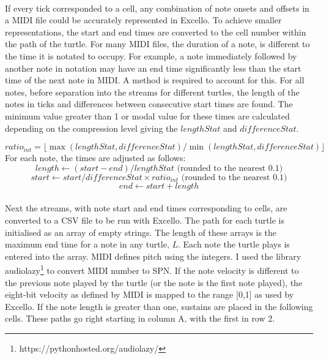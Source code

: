 \paragraph{} If every tick corresponded to a cell, any combination of note onsets and offsets in a MIDI file could be accurately represented in Excello. To achieve smaller representations, the start and end times are converted to the cell number within the path of the turtle. For many MIDI files, the duration of a note, is different to the time it is notated to occupy. For example, a note immediately followed by another note in notation may have an end time significantly less than the start time of the next note in MIDI. A method is required to account for this. For all notes, before separation into the streams for different turtles, the length of the notes in ticks and differences between consecutive start times are found. The minimum value greater than 1 or modal value for these times are calculated depending on the compression level giving the $lengthStat$ and $differenceStat$.

  $$ratio_{int} = \lfloor\max(lengthStat, differenceStat)/\min(lengthStat, differenceStat)\rfloor$$
For each note, the times are adjusted as follows:
  $$length \gets (start - end) / lengthStat \text{ (rounded to the nearest 0.1)}$$
  $$start \gets start / differenceStat \times ratio_{int} \text{ (rounded to the nearest 0.1)}$$
  $$end \gets start +length$$

\paragraph{} Next the streams, with note start and end times corresponding to cells, are converted to a CSV file to be run with Excello. The path for each turtle is initialised as an array of empty strings. The length of these arrays is the maximum end time for a note in any turtle, $L$.  Each note the turtle plays is entered into the array. MIDI defines pitch using the integers. I used the library audiolazy\footnote{https://pythonhosted.org/audiolazy/} to convert MIDI number to SPN. If the note velocity is different to the previous note played by the turtle (or the note is the first note played), the eight-bit velocity as defined by MIDI is mapped to the range [0,1] as used by Excello. If the note length is greater than one, sustains are placed in the following cells. These paths go right starting in column A, with the first in row 2.

